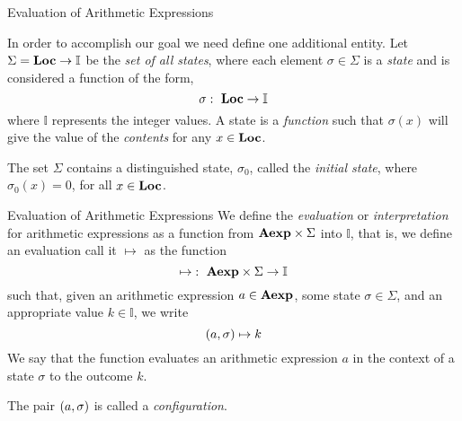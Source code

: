 \documentclass{beamer}
\begin{document}

\begin{frame}{\large Evaluation of Arithmetic Expressions}

In order to accomplish our goal we need define one additional entity.  Let $\Sigma = \mbox{\bf Loc} \rightarrow \mathbb{I}$  be the {\em set of all states}, where each element $\sigma \in \Sigma$ is a {\em state} and is considered
a function of the form,
\[
\sigma\,\colon\; \mbox{\bf Loc} \rightarrow \mathbb{I}
\]
where $\mathbb{I}$ represents the integer values.
A state is a {\em function} such that $\sigma(x)$ will give the value of the {\em contents}
for any $x \in \mbox{\bf Loc}$.

\vspace{.1in}

The set $\Sigma$ contains a distinguished state, $\sigma_0$, called the {\em initial state}, where $\sigma_0(x) = 0$, for all $x \in \mbox{\bf Loc}$.

\end{frame}


\begin{frame}{\large Evaluation of Arithmetic Expressions}
We define the {\em evaluation}  or {\em interpretation} for arithmetic expressions as a function
from $\mbox{\bf Aexp} \times \Sigma$ into $\mathbb{I}$, that is, we define an evaluation
call it $\mapsto$ as the function
\[
\mapsto \,\colon\; \mbox{\bf Aexp} \times \Sigma \rightarrow \mathbb{I}
\]
such that, given an arithmetic expression $a \in \mbox{\bf Aexp}$, some state $\sigma \in \Sigma$, and
an appropriate value $k \in \mathbb{I}$, we write
\[
({a}, {\sigma} ) \mapsto k
\]
We say that the function evaluates an arithmetic expression  $a$ in the context of a state $\sigma$ to
the outcome $k$.

\vspace{.1in}

The pair $({a}, {\sigma} )$ is called a {\em configuration}.

\end{frame}

\end{document}
